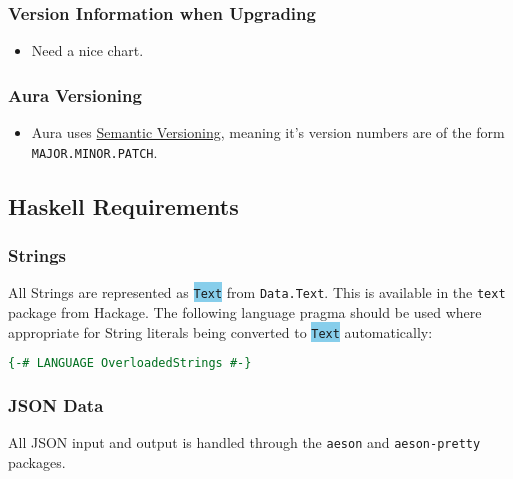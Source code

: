\documentclass{article}
\begin{document}
\subsubsection{Version Information when
Upgrading}\label{version-information-when-upgrading}

\begin{itemize}
\itemsep1pt\parskip0pt
\item
  Need a nice chart.
\end{itemize}

\subsubsection{Aura Versioning}\label{aura-versioning}

\begin{itemize}
\itemsep1pt\parskip0pt
\item
  Aura uses \href{http://semver.org/}{Semantic Versioning}, meaning it's
  version numbers are of the form \texttt{MAJOR.MINOR.PATCH}.
\end{itemize}

\subsection{Haskell Requirements}\label{haskell-requirements}

\subsubsection{Strings}\label{strings}
All Strings are represented as \colorbox{SkyBlue}{\texttt{Text}} from
\texttt{Data.Text}.
This is available in the \texttt{text} package from Hackage. The following
language pragma should be used where appropriate for String literals being
converted to \colorbox{SkyBlue}{\texttt{Text}} automatically:

\begin{shaded}
\begin{lstlisting}[language=haskell]
{-# LANGUAGE OverloadedStrings #-}
\end{lstlisting}
\end{shaded}

\subsubsection{JSON Data}\label{json-data}
All JSON input and output is handled through the \texttt{aeson} and
\texttt{aeson-pretty} packages.
\end{document}
